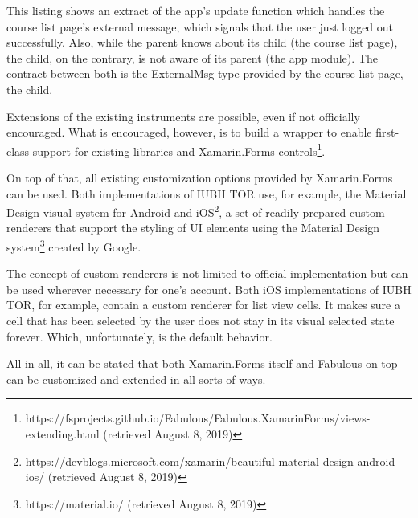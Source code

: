 This listing shows an extract of the app's update function which handles the course list page's external message, which signals that the user just logged out successfully. Also, while the parent knows about its child (the course list page), the child, on the contrary, is not aware of its parent (the app module). The contract between both is the ExternalMsg type provided by the course list page, the child.

Extensions of the existing instruments are possible, even if not officially encouraged. What is encouraged, however, is to build a wrapper to enable first-class support for existing libraries and Xamarin.Forms controls\footnote{https://fsprojects.github.io/Fabulous/Fabulous.XamarinForms/views-extending.html (retrieved August 8, 2019)}.

On top of that, all existing customization options provided by Xamarin.Forms can be used. Both implementations of IUBH TOR use, for example, the Material Design visual system for Android and iOS\footnote{https://devblogs.microsoft.com/xamarin/beautiful-material-design-android-ios/ (retrieved August 8, 2019)}, a set of readily prepared custom renderers that support the styling of UI elements using the Material Design system\footnote{https://material.io/ (retrieved August 8, 2019)} created by Google.

The concept of custom renderers is not limited to official implementation but can be used wherever necessary for one's account. Both iOS implementations of IUBH TOR, for example, contain a custom renderer for list view cells. It makes sure a cell that has been selected by the user does not stay in its visual selected state forever. Which, unfortunately, is the default behavior.

All in all, it can be stated that both Xamarin.Forms itself and Fabulous on top can be customized and extended in all sorts of ways.
